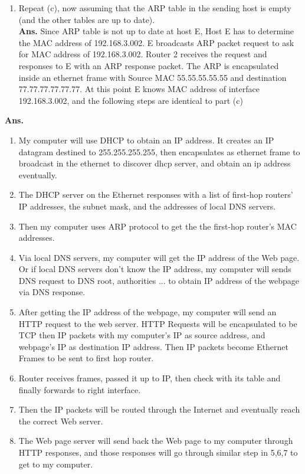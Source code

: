 \documentclass[11pt]{article}
\newenvironment{problem}[2][Problem]{\begin{trivlist}
\item[\hskip \labelsep {\bfseries #1}\hskip \labelsep {\bfseries #2.}]}{\end{trivlist}}
\begin{document}
\begin{enumerate}
\begin{enumerate}
	\end{enumerate}
	
	\item[d. ]
	Repeat (c), now assuming that the ARP table in the sending host is empty (and the
	other tables are up to date).
	\\
	\textbf{Ans. } 
	Since ARP table is not up to date at host E, 
	Host E has to determine the MAC address of 192.168.3.002. 
	E broadcasts ARP packet request to ask for MAC address of 192.168.3.002. 
	Router 2 receives the request and responses to E with an ARP response packet. 
	The ARP is encapsulated inside an ethernet frame with Source MAC 55.55.55.55.55 and destination 77.77.77.77.77.77. 
	At this point E knows MAC address of interface 192.168.3.002, 
	and the following steps are identical to part (c) 
\end{enumerate}


\begin{problem}{2}
\end{problem}
\textbf{Ans. }
\begin{enumerate}
	\item 
	My computer will use DHCP to obtain an IP address. It creates an IP datagram destined to 255.255.255.255, then encapsulates as ethernet frame to broadcast in the ethernet to discover dhcp server, and obtain an ip address eventually. 
	\item 
	The DHCP server on the Ethernet responses with a list of first-hop routers’ IP addresses,
	the subnet mask, and the addresses of local DNS servers.

	\item 
	Then my computer uses ARP protocol to get the the first-hop router’s MAC addresses.

	\item 
	Via local DNS servers, my computer will get the IP address of the Web page. Or if local DNS servers don't know the IP address, my computer will sends DNS request to DNS root, authorities ... to obtain IP address of the webpage via DNS response.

	\item 
	After getting the IP address of the webpage, my computer will send an HTTP request to the web server. 
	HTTP Requests will be encapsulated to be TCP then IP packets with my computer's IP as source address, and webpage's IP as destination IP address.
	Then IP packets become Ethernet Frames to be sent to first hop router. 

	\item 
	Router receives frames, passed it up to IP, then check with its table and finally forwards to right interface.

	\item 
	Then the IP packets will be routed through the Internet and eventually reach the correct Web server.

	\item 
	The Web page server will send back the Web page to my computer through HTTP responses, and those responses will go through similar step in 5,6,7 to get to my computer.
	
\end{enumerate}
\end{document}
